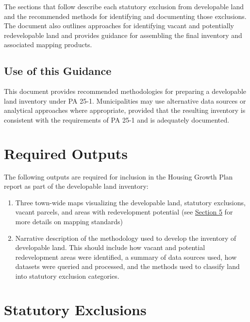 \documentclass[
  letterpaper,
  DIV=11,
  numbers=noendperiod]{scrreprt}
\begin{document}
The sections that follow describe each statutory exclusion from
developable land and the recommended methods for identifying and
documenting those exclusions. The document also outlines approaches for
identifying vacant and potentially redevelopable land and provides
guidance for assembling the final inventory and associated mapping
products.\\

\section{Use of this Guidance}\label{use-of-this-guidance}

This document provides recommended methodologies for preparing a
developable land inventory under PA 25-1. Municipalities may use
alternative data sources or analytical approaches where appropriate,
provided that the resulting inventory is consistent with the
requirements of PA 25-1 and is adequately documented.


\chapter{Required Outputs}\label{required-outputs}

The following outputs are required for inclusion in the Housing Growth
Plan report as part of the developable land inventory:

\begin{enumerate}
\def\labelenumi{\arabic{enumi}.}
\item
  Three town-wide maps visualizing the developable land, statutory
  exclusions, vacant parcels, and areas with redevelopment potential
  (see \href{map.qmd}{Section 5} for more details on mapping standards)
\item
  Narrative description of the methodology used to develop the inventory
  of developable land. This should include how vacant and potential
  redevelopment areas were identified, a summary of data sources used,
  how datasets were queried and processed, and the methods used to
  classify land into statutory exclusion categories.
\end{enumerate}


\chapter{Statutory Exclusions}\label{sec-statutory-exclusions}
\end{document}
